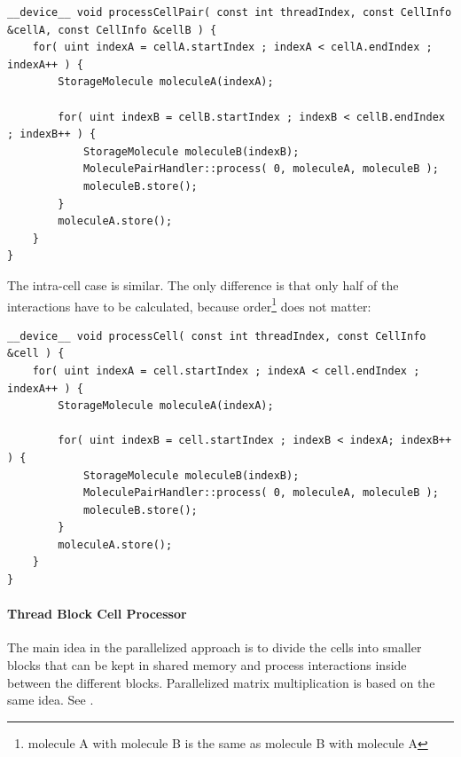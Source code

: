 \begin{lstlisting}[label=intercellreferenceloop,caption=reference inter-cell block processing]
__device__ void processCellPair( const int threadIndex, const CellInfo &cellA, const CellInfo &cellB ) {
	for( uint indexA = cellA.startIndex ; indexA < cellA.endIndex ; indexA++ ) {
		StorageMolecule moleculeA(indexA);

		for( uint indexB = cellB.startIndex ; indexB < cellB.endIndex ; indexB++ ) {
			StorageMolecule moleculeB(indexB);
			MoleculePairHandler::process( 0, moleculeA, moleculeB );
			moleculeB.store();
		}
		moleculeA.store();
	}
}
\end{lstlisting}
The intra-cell case is similar. The only difference is that only half of the interactions have to be calculated, because order\footnote{molecule A with molecule B is the same as molecule B with molecule A} does not matter:
\begin{lstlisting}[label=intracellreferenceloop,caption=reference intra-cell block processing]
__device__ void processCell( const int threadIndex, const CellInfo &cell ) {
	for( uint indexA = cell.startIndex ; indexA < cell.endIndex ; indexA++ ) {
		StorageMolecule moleculeA(indexA);

		for( uint indexB = cell.startIndex ; indexB < indexA; indexB++ ) {
			StorageMolecule moleculeB(indexB);
			MoleculePairHandler::process( 0, moleculeA, moleculeB );
			moleculeB.store();
		}
		moleculeA.store();
	}
}
\end{lstlisting}

\paragraph{Thread Block Cell Processor}
The main idea in the parallelized approach is to divide the cells into smaller blocks that can be kept in shared memory and process interactions inside between the different blocks. Parallelized matrix multiplication is based on the same idea. See \cite{cuda11progguide}.

